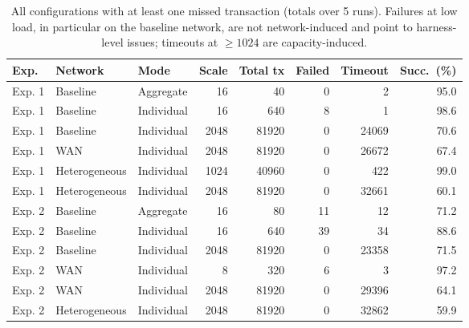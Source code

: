 \begin{table}[h]
\centering
\footnotesize
\caption{All configurations with at least one missed transaction (totals over 5 runs). Failures at low load, in particular on the baseline network, are not network-induced and point to harness-level issues; timeouts at $\geq 1024$ are capacity-induced.}
\label{tab:anomalies}
\begin{tabular}{@{}lllrrrrr@{}}
\toprule
Exp. & Network & Mode & Scale & Total tx & Failed & Timeout & Succ.\ (\%) \\
\midrule
Exp. 1 & Baseline & Aggregate & 16 & 40 & 0 & 2 & 95.0 \\
Exp. 1 & Baseline & Individual & 16 & 640 & 8 & 1 & 98.6 \\
Exp. 1 & Baseline & Individual & 2048 & 81920 & 0 & 24069 & 70.6 \\
Exp. 1 & WAN & Individual & 2048 & 81920 & 0 & 26672 & 67.4 \\
Exp. 1 & Heterogeneous & Individual & 1024 & 40960 & 0 & 422 & 99.0 \\
Exp. 1 & Heterogeneous & Individual & 2048 & 81920 & 0 & 32661 & 60.1 \\
Exp. 2 & Baseline & Aggregate & 16 & 80 & 11 & 12 & 71.2 \\
Exp. 2 & Baseline & Individual & 16 & 640 & 39 & 34 & 88.6 \\
Exp. 2 & Baseline & Individual & 2048 & 81920 & 0 & 23358 & 71.5 \\
Exp. 2 & WAN & Individual & 8 & 320 & 6 & 3 & 97.2 \\
Exp. 2 & WAN & Individual & 2048 & 81920 & 0 & 29396 & 64.1 \\
Exp. 2 & Heterogeneous & Individual & 2048 & 81920 & 0 & 32862 & 59.9 \\
\bottomrule
\end{tabular}
\end{table}